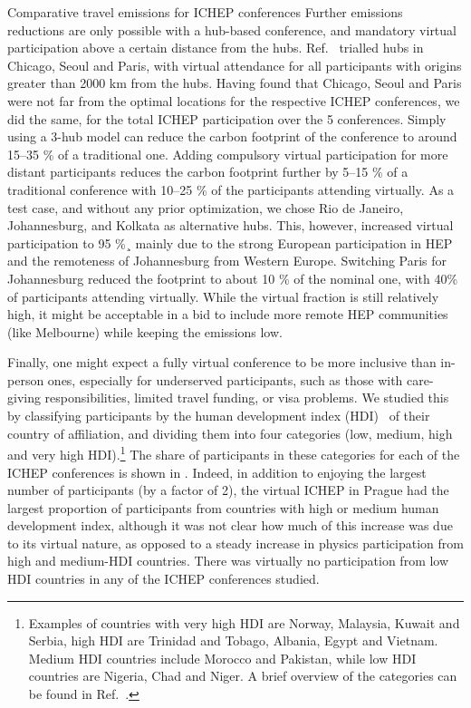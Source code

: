 \documentclass[../SustainableHEP.tex]{subfiles}
\begin{document}
\begin{casestudy}{Comparative travel emissions for ICHEP conferences}
Further emissions reductions are only possible with a hub-based conference, and mandatory virtual participation above a certain distance from the hubs. Ref.~\cite{RefAGU} trialled hubs in Chicago, Seoul and Paris, with virtual attendance for all participants with origins greater than 2000 km from the hubs.  Having found that Chicago, Seoul and Paris were not far from the optimal locations for the respective ICHEP conferences, we did the same, for the total ICHEP participation over the 5 conferences.  Simply using a 3-hub model can reduce the carbon footprint of the conference to around 15--35 \% of a traditional one.  Adding compulsory virtual participation for more distant participants reduces the carbon footprint further by 5--15 \% of a traditional conference with 10--25 \% of the participants attending virtually.  As a test case, and without any prior optimization, we chose Rio de Janeiro, Johannesburg, and Kolkata as alternative hubs. This, however, increased virtual participation to 95 \%¸ mainly due to the strong European participation in HEP and the remoteness of Johannesburg from Western Europe. Switching Paris for Johannesburg reduced the footprint to about 10 \% of the nominal one, with 40\% of participants attending virtually. While the virtual fraction is still relatively high, it might be acceptable in a bid to include more remote HEP communities (like Melbourne) while keeping the emissions low.

Finally, one might expect a fully virtual conference to be more inclusive than in-person ones, especially for underserved participants, such as those with care-giving responsibilities, limited travel funding, or visa problems.  We studied this by classifying participants by the human development index (HDI)~\cite{hdiref} of their country of affiliation, and dividing them into four categories (low, medium, high and very high HDI).\footnote{Examples of countries with very high HDI are Norway,  Malaysia, Kuwait and Serbia, high HDI are \eg Trinidad and Tobago, Albania, Egypt and Vietnam. Medium HDI countries include Morocco and Pakistan, while low HDI countries are \eg Nigeria, Chad and Niger. A brief overview of the categories can be found in Ref.~\cite{hdiref}.}  The share of participants in these categories for each of the ICHEP conferences is shown in . Indeed, in addition to enjoying the largest number of participants (by a factor of 2), the virtual ICHEP in Prague had the largest proportion of participants from countries with high or medium human development index, although it was not clear how much of this increase was due to its virtual nature, as opposed to a steady increase in physics participation from high and medium-HDI countries.  There was virtually no participation from low HDI countries in any of the ICHEP conferences studied.


\end{casestudy}
\end{document}
